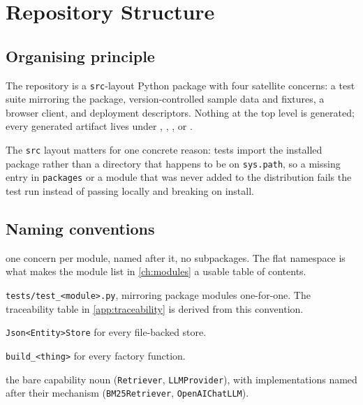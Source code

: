 
\chapter{Repository Structure}
\label{ch:repository-structure}

\section{Organising principle}

The repository is a \texttt{src}-layout Python package with four satellite
concerns: a test suite mirroring the package, version-controlled sample data
and fixtures, a browser client, and deployment descriptors. Nothing at the top
level is generated; every generated artifact lives under ,
, , or
.

The \texttt{src} layout matters for one concrete reason: tests import the
installed package rather than a directory that happens to be on
\texttt{sys.path}, so a missing entry in \texttt{packages} or a module that was
never added to the distribution fails the test run instead of passing locally
and breaking on install.

\section{Naming conventions}

\begin{description}[nosep]
  \item[Modules] one concern per module, named after it, no subpackages. The
    flat namespace is what makes the module list in \cref{ch:modules} a usable
    table of contents.
  \item[Tests] \texttt{tests/test\_<module>.py}, mirroring package modules
    one-for-one. The traceability table in \cref{app:traceability} is derived
    from this convention.
  \item[Stores] \texttt{Json<Entity>Store} for every file-backed store.
  \item[Factories] \texttt{build\_<thing>} for every factory function.
  \item[Protocols] the bare capability noun (\texttt{Retriever},
    \texttt{LLMProvider}), with implementations named after their mechanism
    (\texttt{BM25Retriever}, \texttt{OpenAIChatLLM}).
\end{description}


